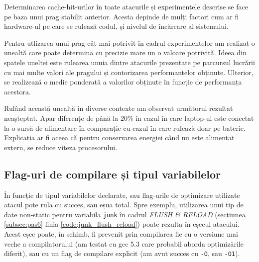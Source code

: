 Determinarea cache-hit-urilor în toate atacurile și experimentele descrise se
face pe baza unui prag stabilit anterior. Acesta depinde de mulți factori cum
ar fi hardware-ul pe care se rulează codul, și nivelul de încărcare al sistemului.

Pentru utlizarea unui prag cât mai potrivit în cadrul experimentelor am
realizat o unealtă care poate determina cu precizie mare un o valoare
potrivită. Ideea din spatele uneltei este rulearea unuia dintre atacurile
prezentate pe parcursul lucrării cu mai multe valori ale pragului și contorizarea
performantelor obținute. Ulterior, se realizează o medie ponderată a valorilor
obținute în funcție de performanța acestora.

Rulând această unealtă în diverse contexte am observat următorul rezultat
neașteptat. Apar diferențe de până la $20\%$ în cazul în care laptop-ul este 
conectat la o sursă de alimentare în comparație cu cazul în care rulează doar
pe baterie. Explicația ar fi aceea că pentru conservarea energiei când nu este
alimentat extern, se reduce viteza procesorului.

\subsection{Flag-uri de compilare și tipul variabilelor}

În funcție de tipul variabilelor declarate, sau flag-urile de optimizare
utilizate atacul pote rula cu succes, sau eșua total. Spre exemplu, utilizarea
unui tip de date non-static pentru variabila \texttt{junk} în cadrul
\emph{FLUSH \& RELOAD} (secțiunea \ref{subsec:pas6} linia
\ref{code:junk_flush_reload}) poate rezulta în eșecul atacului. Acest eșec
poate, în schimb, fi prevenit prin compilarea fie cu o versiune mai veche a
compilatorului (am testat cu gcc 5.3 care probabil aborda optimizările
diferit), sau cu un flag de compilare explicit (am avut succes cu \texttt{-O},
sau \texttt{-O1}).
